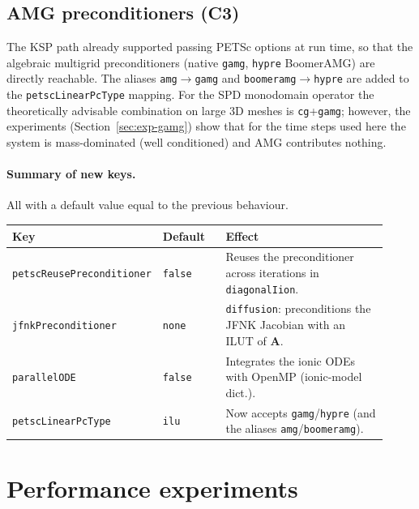 \documentclass[11pt,a4paper]{article}
\newcommand{\code}[1]{\texttt{\small #1}}
\newcommand{\Aimp}{\mathbf{A}}
\newcommand{\dictkey}[1]{\textcolor{black!60!green}{\texttt{\footnotesize #1}}}
\begin{document}
\subsection{AMG preconditioners (C3)}
\label{sec:optim-C3}

The KSP path already supported passing PETSc options at run time, so
that the algebraic multigrid preconditioners (native \code{gamg}, \code{hypre}
BoomerAMG) are directly reachable. The aliases
\code{amg}$\to$\code{gamg} and \code{boomeramg}$\to$\code{hypre} are added to the
\dictkey{petscLinearPcType} mapping. For the SPD monodomain operator the
theoretically advisable combination on large 3D meshes is \code{cg}+\code{gamg}; however,
the experiments (Section~\ref{sec:exp-gamg}) show that for the time steps
used here the system is mass-dominated (well conditioned) and
AMG contributes nothing.

\paragraph{Summary of new keys.}
All with a default value equal to the previous behaviour.

\begin{center}
\begin{tabular}{@{}p{0.30\linewidth}p{0.17\linewidth}p{0.45\linewidth}@{}}
\toprule
Key & Default & Effect \\
\midrule
\dictkey{petscReusePreconditioner} & \code{false} & Reuses the preconditioner
    across iterations in \dictkey{diagonalIion}. \\
\dictkey{jfnkPreconditioner} & \code{none} & \code{diffusion}: preconditions the
    JFNK Jacobian with an ILUT of $\Aimp$. \\
\dictkey{parallelODE} & \code{false} & Integrates the ionic ODEs with OpenMP
    (ionic-model dict.). \\
\dictkey{petscLinearPcType} & \code{ilu} & Now accepts \code{gamg}/\code{hypre}
    (and the aliases \code{amg}/\code{boomeramg}). \\
\bottomrule
\end{tabular}
\end{center}

\section{Performance experiments}
\label{sec:exp}
\end{document}
